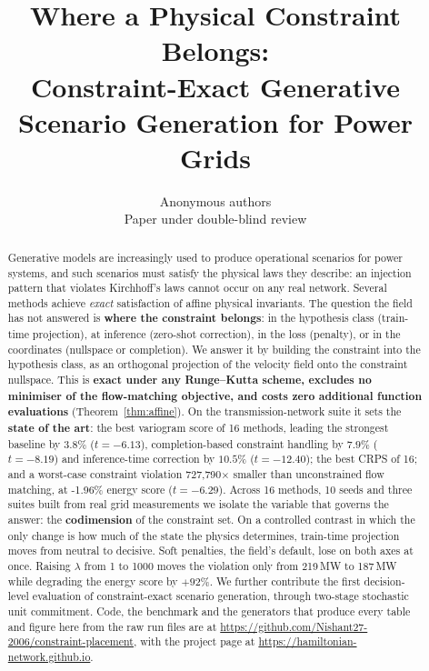 \documentclass{article}
\title{Where a Physical Constraint Belongs:\\
Constraint-Exact Generative Scenario Generation for Power Grids}
\author{Anonymous authors\\
Paper under double-blind review}
\begin{document}
\maketitle

\begin{abstract}
Generative models are increasingly used to produce operational scenarios for power systems, and such scenarios must satisfy the physical laws they describe: an injection pattern that violates Kirchhoff's laws cannot occur on any real network. Several methods achieve \emph{exact} satisfaction of affine physical invariants. The question the field has not answered is \textbf{where the constraint belongs}: in the hypothesis class (train-time projection), at inference (zero-shot correction), in the loss (penalty), or in the coordinates (nullspace or completion). 
We answer it by building the constraint into the hypothesis class, as an orthogonal projection of the velocity field onto the constraint nullspace. This is \textbf{exact under any Runge--Kutta scheme, excludes no minimiser of the flow-matching objective, and costs zero additional function evaluations} (Theorem~\ref{thm:affine}). 
On the transmission-network suite it sets the \textbf{state of the art}: the best variogram score of 16 methods, leading the strongest baseline by $3.8\%$ ($t=-6.13$), completion-based constraint handling by $7.9\%$ ($t=-8.19$) and inference-time correction by $10.5\%$ ($t=-12.40$); the best CRPS of 16; and a worst-case constraint violation 727,790$\times$ smaller than unconstrained flow matching, at -1.96\% energy score ($t=-6.29$). 
Across 16 methods, 10 seeds and three suites built from real grid measurements we isolate the variable that governs the answer: the \textbf{codimension} of the constraint set. On a controlled contrast in which the only change is how much of the state the physics determines, train-time projection moves from neutral to decisive. Soft penalties, the field's default, lose on both axes at once. Raising $\lambda$ from 1 to 1000 moves the violation only from 219\,MW to 187\,MW while degrading the energy score by $+92\%$. We further contribute the first decision-level evaluation of constraint-exact scenario generation, through two-stage stochastic unit commitment. Code, the benchmark and the generators that produce every table and figure here from the raw run files are at \url{https://github.com/Nishant27-2006/constraint-placement}, with the project page at \url{https://hamiltonian-network.github.io}.
\end{abstract}
\end{document}
